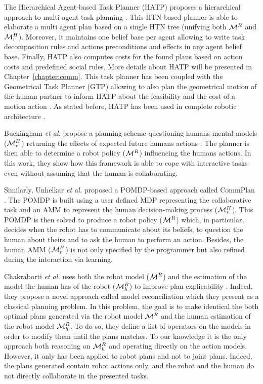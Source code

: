 \documentclass[a4paper,11pt,twoside]{StyleThese}
\begin{document}
The Hierarchical Agent-based Task Planner (HATP) proposes a hierarchical approach to multi agent task planning \cite{alili2009task, lallement2014hatp}. This HTN based planner is able to elaborate a multi agent plan based on a single HTN tree (unifying both $\mathcal{M}^R$ and $\mathcal{M}^H_r$). Moreover, it maintains one belief base per agent allowing to write task decomposition rules and actions preconditions and effects in any agent belief base. Finally, HATP also computes costs for the found plans based on action costs and predefined social rules. More details about HATP will be presented in Chapter~\ref{chapter:comm}. This task planner has been coupled with the Geometrical Task Planner (GTP) allowing to also plan the geometrical motion of the human partner to inform HATP about the feasibility and the cost of a motion action \cite{gharbi2015combining}. As stated before, HATP has been used in complete robotic architecture \cite{devin2016implemented, lemaignan2017artificial}.

Buckingham \textit{et al.} propose a planning scheme questioning humans mental models ($\mathcal{M}^H_r$) returning the effects of expected future humans actions \cite{buckingham2020robot}. The planner is then able to determine a robot policy ($\mathcal{M}^R$) influencing the humans actions. In this work, they show how this framework is able to cope with interactive tasks even without assuming that the human is collaborating.

Similarly, Unhelkar \textit{et al.} proposed a POMDP-based approach called CommPlan \cite{unhelkar2020decision}. The POMDP is built using a user defined MDP representing the collaborative task and an AMM to represent the human decision-making process ($\mathcal{M}^H_r$). This POMDP is then solved to produce a robot policy ($\mathcal{M}^R$) which, in particular, decides when the robot has to communicate about its beliefs, to question the human about theirs and to ask the human to perform an action. Besides, the human AMM ($\mathcal{M}^H_r$) is not only specified by the programmer but also refined during the interaction via learning. 

Chakraborti \textit{et al.} uses both the robot model ($\mathcal{M}^R$) and the estimation of the model the human has of the robot ($\mathcal{M}^R_h$) to improve plan explicability \cite{chakraborti2017plan}. Indeed, they propose a novel approach called model reconciliation which they present as a classical planning problem. In this problem, the goal is to make identical the both optimal plans generated via the robot model $\mathcal{M}^R$ and the human estimation of the robot model $\mathcal{M}^R_h$. To do so, they define a list of operators on the models in order to modify them until the plans matches. To our knowledge it is the only approach both reasoning on $\mathcal{M}^R_h$ and operating directly on the action models. However, it only has been applied to robot plans and not to joint plans. Indeed, the plans generated contain robot actions only, and the robot and the human do not directly collaborate in the presented tasks.
\end{document}
